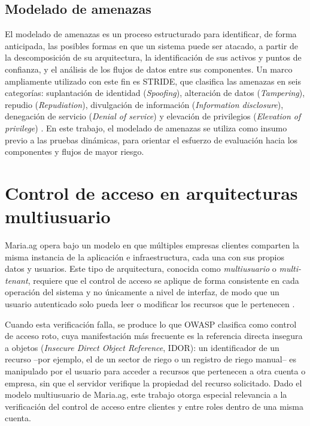 \documentclass[12pt,letterpaper]{report}
\begin{document}
\subsection*{Modelado de amenazas}
El modelado de amenazas es un proceso estructurado para identificar, de forma
anticipada, las posibles formas en que un sistema puede ser atacado, a partir
de la descomposición de su arquitectura, la identificación de sus activos y
puntos de confianza, y el análisis de los flujos de datos entre sus
componentes. Un marco ampliamente utilizado con este fin es STRIDE, que
clasifica las amenazas en seis categorías: suplantación de identidad
(\textit{Spoofing}), alteración de datos (\textit{Tampering}), repudio
(\textit{Repudiation}), divulgación de información (\textit{Information
disclosure}), denegación de servicio (\textit{Denial of service}) y elevación
de privilegios (\textit{Elevation of privilege}) \autocite{shostack2014}. En
este trabajo, el modelado de amenazas se utiliza como insumo previo a las
pruebas dinámicas, para orientar el esfuerzo de evaluación hacia los
componentes y flujos de mayor riesgo.

\section*{Control de acceso en arquitecturas multiusuario}

Maria.ag opera bajo un modelo en que múltiples empresas clientes comparten la
misma instancia de la aplicación e infraestructura, cada una con sus propios
datos y usuarios. Este tipo de arquitectura, conocida como
\textit{multiusuario} o \textit{multi-tenant}, requiere que el control de
acceso se aplique de forma consistente en cada operación del sistema y no
únicamente a nivel de interfaz, de modo que un usuario autenticado solo pueda
leer o modificar los recursos que le pertenecen \autocite{owasp2025top10}.

Cuando esta verificación falla, se produce lo que OWASP clasifica como
control de acceso roto, cuya manifestación más frecuente es la referencia
directa insegura a objetos (\textit{Insecure Direct Object Reference}, IDOR):
un identificador de un recurso --por ejemplo, el de un sector de riego o un
registro de riego manual-- es manipulado por el usuario para acceder a
recursos que pertenecen a otra cuenta o empresa, sin que el servidor verifique
la propiedad del recurso solicitado. Dado el modelo multiusuario de Maria.ag,
este trabajo otorga especial relevancia a la verificación del control de
acceso entre clientes y entre roles dentro de una misma cuenta.
\end{document}
